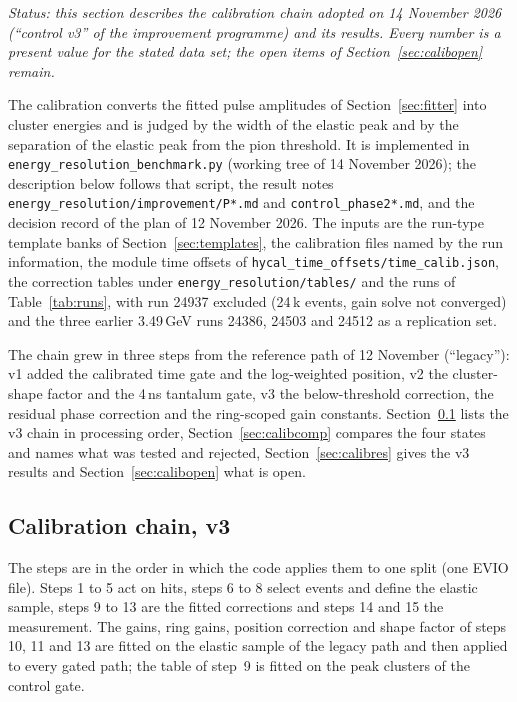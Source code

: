 \documentclass[11pt]{article}
\newcommand{\code}[1]{\texttt{#1}}
\begin{document}
\emph{Status: this section describes the calibration chain adopted on 14 November 2026 (``control v3'' of the improvement programme) and its results. Every number is a present value for the stated data set; the open items of Section~\ref{sec:calibopen} remain.}

The calibration converts the fitted pulse amplitudes of Section~\ref{sec:fitter} into cluster energies and is judged by the width of the elastic peak and by the separation of the elastic peak from the pion threshold. It is implemented in \code{energy\_resolution\_benchmark.py} (working tree of 14 November 2026); the description below follows that script, the result notes \code{energy\_resolution/improvement/P*.md} and \code{control\_phase2*.md}, and the decision record of the plan of 12 November 2026. The inputs are the run-type template banks of Section~\ref{sec:templates}, the calibration files named by the run information, the module time offsets of \code{hycal\_time\_offsets/time\_calib.json}, the correction tables under \code{energy\_resolution/tables/} and the runs of Table~\ref{tab:runs}, with run 24937 excluded (24\,k events, gain solve not converged) and the three earlier 3.49\,GeV runs 24386, 24503 and 24512 as a replication set.

The chain grew in three steps from the reference path of 12 November (``legacy''): v1 added the calibrated time gate and the log-weighted position, v2 the cluster-shape factor and the 4\,ns tantalum gate, v3 the below-threshold correction, the residual phase correction and the ring-scoped gain constants. Section~\ref{sec:calibchain} lists the v3 chain in processing order, Section~\ref{sec:calibcomp} compares the four states and names what was tested and rejected, Section~\ref{sec:calibres} gives the v3 results and Section~\ref{sec:calibopen} what is open.

\subsection{Calibration chain, v3}\label{sec:calibchain}

The steps are in the order in which the code applies them to one split (one EVIO file). Steps 1 to 5 act on hits, steps 6 to 8 select events and define the elastic sample, steps 9 to 13 are the fitted corrections and steps 14 and 15 the measurement. The gains, ring gains, position correction and shape factor of steps 10, 11 and 13 are fitted on the elastic sample of the legacy path and then applied to every gated path; the table of step~9 is fitted on the peak clusters of the control gate.
\end{document}
